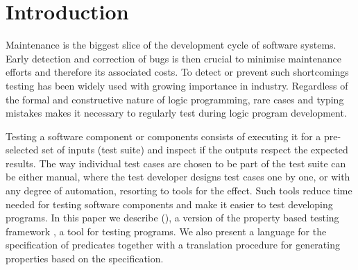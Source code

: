 
\section{Introduction}
\label{sec:intro}


Maintenance is the biggest slice of the development cycle of software
systems.
%
Early detection and correction of bugs is then crucial to minimise
maintenance efforts and therefore its associated costs.
%
To detect or prevent such shortcomings testing has been widely used with
growing importance in industry.
%
Regardless of the formal and constructive nature of logic programming,
rare cases and typing mistakes makes it necessary to regularly test
during logic program development.

Testing a software component or components consists of executing it for
a pre-selected set of inputs (test suite) and inspect if the outputs
respect the expected results.
%
%
The way individual test cases are chosen to be part of the test suite
can be either manual, where the test developer designs test cases one by
one, or with any degree of automation, resorting to tools for the
effect.
%
Such tools reduce time needed for testing software components and make
it easier to test developing programs.
%
In this paper we describe \plqc{} (\Prolog\QuickCheck), a \Prolog{}
version of the property based testing framework \QuickCheck, a tool for
testing \Prolog{} programs.
%
We also present a language for the specification of \Prolog{} predicates
together with a translation procedure for generating \plqc{} properties
based on the specification.


